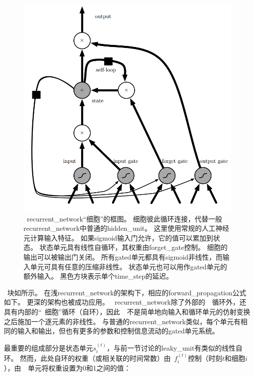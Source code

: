 \begin{figure}[!h]
	\centering
	\includegraphics[scale=0.3]{figures/chapter_2/LSTM_cell.png}
	\caption{~\gls{recurrent_network}``细胞''的框图。
		细胞彼此循环连接，代替一般\gls{recurrent_network}中普通的\gls{hidden_unit}。
		这里使用常规的人工神经元计算输入特征。
		如果sigmoid输入门允许，它的值可以累加到状态。
		状态单元具有线性自循环，其权重由\gls{forget_gate}控制。
		细胞的输出可以被输出门关闭。
		所有\gls{gated}单元都具有sigmoid非线性，而输入单元可具有任意的压缩非线性。
		状态单元也可以用作\gls{gated}单元的额外输入。
		黑色方块表示单个\gls{time_step}的延迟。
	}\label{fig:chapter2_lstm_cell}
\end{figure}

~块如所示。
在浅\gls{recurrent_network}的架构下，相应的\gls{forward_propagation}公式如下。
更深的架构也被成功应用\citep{Graves-et-al-ICASSP2013,Pascanu-et-al-ICLR2014}。
~\gls{recurrent_network}除了外部的~~循环外，还具有内部的``~细胞''循环（自环），因此~~不是简单地向输入和循环单元的仿射变换之后施加一个逐元素的非线性。
与普通的\gls{recurrent_network}类似，每个单元有相同的输入和输出，但也有更多的参数和控制信息流动的\gls{gated}单元系统。

最重要的组成部分是状态单元$s_i^{(t)}$，与前一节讨论的\gls{leaky_unit}有类似的线性自环。
然而，此处自环的权重（或相关联的时间常数）由~$f_i^{(t)}$控制（时刻$t$和细胞$i$），由~~单元将权重设置为0和1之间的值：

